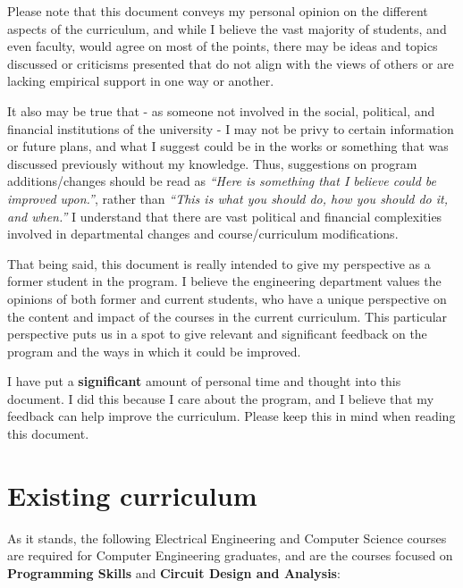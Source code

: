 \documentclass[12pt]{article}
\numberwithin{figure}{section}
\numberwithin{equation}{section}
\begin{document}
{Please note that this document conveys my personal opinion on the
different aspects of the curriculum, and while I believe the vast
majority of students, and even faculty, would agree on most of the
points, there may be ideas and topics discussed or criticisms presented
that do not align with the views of others or are lacking empirical
support in one way or another.

\bigskip

It also may be true that - as someone not involved in the social, political,
and financial institutions of the university - I may not be privy to certain
information or future plans, and what I suggest could be in the works or something that was discussed previously without my knowledge. Thus, suggestions on program additions/changes should be read as \emph{``Here is something that I believe could be improved upon.''}, rather than \emph{``This is what you should do, how you should do it, and when.''} I understand that there are vast political and financial complexities involved in departmental changes and course/curriculum modifications.

\bigskip

That being said, this document is really intended to give my perspective
as a former student in the program. I believe the engineering department
values the opinions of both former and current students, who have a
unique perspective on the content and impact of the courses in the
current curriculum. This particular perspective puts us in a spot to
give relevant and significant feedback on the program and the ways in
which it could be improved.

\bigskip

I have put a \textbf{significant} amount of personal time and thought into this document. I did this because I care about the program, and I believe that my feedback can help improve the curriculum. Please keep this in mind when reading this document.

\newpage
\section{Existing curriculum}\label{existing-curriculum}
As it stands, the following Electrical Engineering and Computer Science
courses are required for Computer Engineering graduates, and are the
courses focused on \textbf{Programming Skills} and \textbf{Circuit
Design and Analysis}:

}
\end{document}
